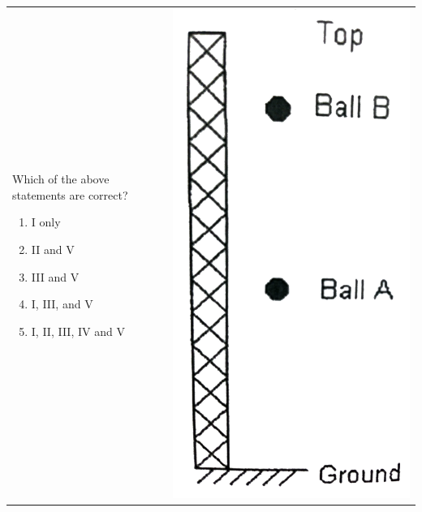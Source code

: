 \documentclass[12pt,letterpaper]{article}
\begin{document}
\begin{enumerate}
\begin{tabular}{l r}
\begin{minipage}{0.775\textwidth}
Which of the above statements are correct?
\begin{enumerate}
\item I only
\item II and V
\item III and V
\item I, III, and V
\item I, II, III, IV and V
\end{enumerate}
\end{minipage} &
\begin{minipage}{0.125\textwidth}
\includegraphics[width=\textwidth]{tower.png}
\end{minipage}
\end{tabular}


\end{enumerate}
\end{document}
